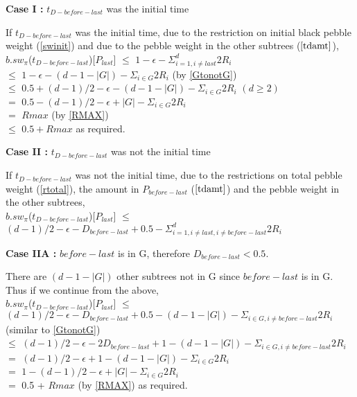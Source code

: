 \documentclass[12pt]{article}
\begin{document}
\noindent
{\bf Case I :} $t_{D-before-last}$ was the initial time

If $t_{D-before-last}$ was the initial time, due to the restriction on initial black pebble weight (\ref{swinit}) and due to the pebble weight in the other subtrees ($\ref{tdamt}$),\\
$b.sw_{\pi}$($t_{D-before-last}$)[$P_{last}$] $\leq$ $1 - \epsilon - \Sigma_{i=1, i \ne last}^d 2R_i$\\
$\leq$ $1 - \epsilon - (d-1-|G|) - \Sigma_{i \in G} 2R_i$ (by \ref{GtonotG})\\
$\leq$ $0.5 + (d-1)/2  - \epsilon - (d-1-|G|) - \Sigma_{i \in G} 2R_i$ $(d \geq 2)$\\
$=$ $0.5 - (d-1)/2  - \epsilon + |G| - \Sigma_{i \in G} 2R_i$\\
$=$ $Rmax$ (by \ref{RMAX})\\
$\leq$ $0.5 + Rmax$ as required.

\medskip

\noindent
{\bf Case II :} $t_{D-before-last}$ was not the initial time

If $t_{D-before-last}$ was not the initial time, due to the restrictions on total pebble weight (\ref{rtotal}), the amount in $P_{before-last}$ ($\ref{tdamt}$) and the pebble weight in the other subtrees,\\
$b.sw_{\pi}$($t_{D-before-last}$)[$P_{last}$] $\leq$ $(d-1)/2 - \epsilon - D_{before-last} + 0.5 - \Sigma_{i=1, i \ne last , i \ne before-last}^d 2R_i$

\medskip

\noindent
{\bf Case IIA :}  $before-last$ is in G, therefore $D_{before-last} < 0.5$. 

There are $(d-1-|G|)$ other subtrees not in G since ${before-last}$ is in G. Thus if we continue from the above,\\
$b.sw_{\pi}$($t_{D-before-last}$)[$P_{last}$] $\leq$ $(d-1)/2 - \epsilon - D_{before-last} + 0.5 - (d-1-|G|) - \Sigma_{i \in G , i \ne before-last} 2R_i$ (similar to \ref{GtonotG}) \\
$\leq$ $(d-1)/2 - \epsilon - 2D_{before-last} + 1 - (d-1-|G|) - \Sigma_{i \in G , i \ne before-last} 2R_i$ \\
$=$ $(d-1)/2 - \epsilon + 1 - (d-1-|G|) - \Sigma_{i \in G} 2R_i$ \\
$=$ $1 - (d-1)/2  - \epsilon + |G| - \Sigma_{i \in G} 2R_i$\\
$=$ 0.5 + $Rmax$ (by \ref{RMAX}) as required.

\medskip
\end{document}

